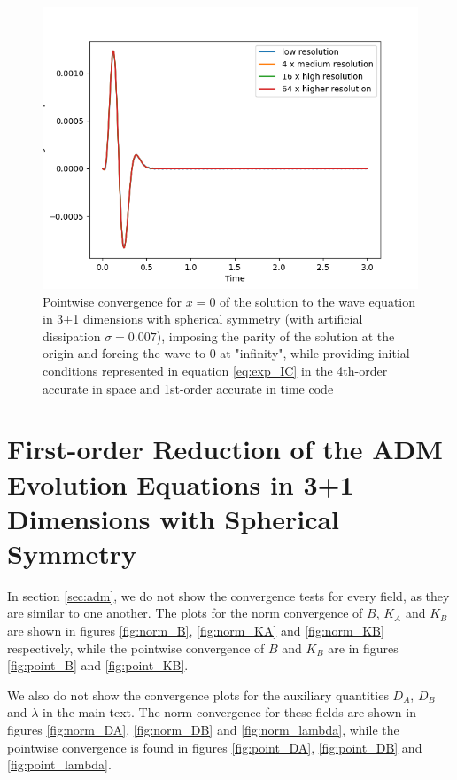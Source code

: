 \begin{figure}[H]
    \centering
    \includegraphics[width=0.9\columnwidth]{Images/spherical_wave-4th-point.png}
    \caption{Pointwise convergence for $x = 0$ of the solution to the wave equation in 3+1 dimensions with spherical symmetry (with artificial dissipation $\sigma = 0.007$), imposing the parity of the solution at the origin and forcing the wave to 0 at "infinity", while providing initial conditions represented in equation \ref{eq:exp_IC} in the 4th-order accurate in space and 1st-order accurate in time code}
    \label{fig:point_spherical_wave_4th_order}
\end{figure}

\newpage

\section{First-order Reduction of the ADM Evolution Equations in 3+1 Dimensions with Spherical Symmetry}

In section \ref{sec:adm}, we do not show the convergence tests for every field, as they are similar to one another. The plots for the norm convergence of $B$, $K_A$ and $K_B$ are shown in figures \ref{fig:norm_B}, \ref{fig:norm_KA} and \ref{fig:norm_KB} respectively, while the pointwise convergence of $B$ and $K_B$ are in figures \ref{fig:point_B} and \ref{fig:point_KB}. 

We also do not show the convergence plots for the auxiliary quantities $D_A$, $D_B$ and $\lambda$ in the main text. The norm convergence for these fields are shown in figures \ref{fig:norm_DA}, \ref{fig:norm_DB} and \ref{fig:norm_lambda}, while the pointwise convergence is found in figures \ref{fig:point_DA}, \ref{fig:point_DB} and \ref{fig:point_lambda}. 

